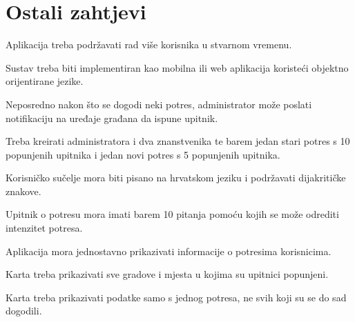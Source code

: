 		\section{Ostali zahtjevi}
				\begin{packed_item}
					\item Aplikacija treba podržavati rad više korisnika u stvarnom vremenu.
					\item Sustav treba biti implementiran kao mobilna ili web aplikacija koristeći objektno orijentirane jezike.
					\item Neposredno nakon što se dogodi neki potres, administrator može poslati notifikaciju na uređaje građana da ispune upitnik.
					\item Treba kreirati administratora i dva znanstvenika te barem jedan stari potres s 10 popunjenih upitnika i jedan novi potres s 5 popunjenih upitnika.
					\item Korisničko sučelje mora biti pisano na hrvatskom jeziku i podržavati dijakritičke znakove.
					\item Upitnik o potresu mora imati barem 10 pitanja pomoću kojih se može odrediti intenzitet potresa.
					\item Aplikacija mora jednostavno prikazivati informacije o potresima korisnicima.
					\item Karta treba prikazivati sve gradove i mjesta u kojima su upitnici popunjeni.
					\item Karta treba prikazivati podatke samo s jednog potresa, ne svih koji su se do sad dogodili.
				\end{packed_item}